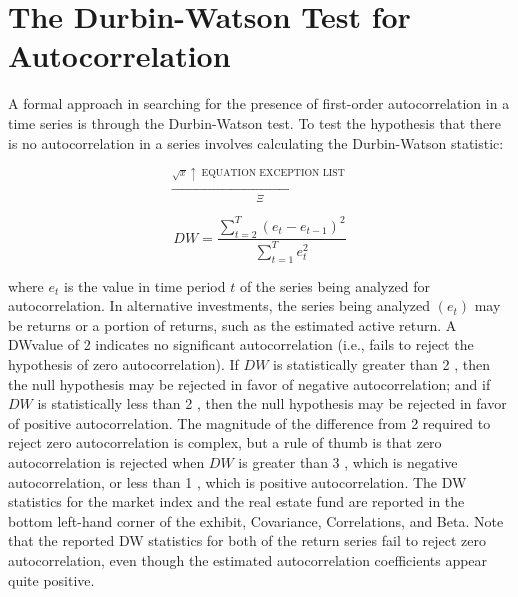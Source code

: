 \documentclass[11pt]{article}
\begin{document}
\section*{The Durbin-Watson Test for Autocorrelation}
A formal approach in searching for the presence of first-order autocorrelation in a time series is through the Durbin-Watson test. To test the hypothesis that there is no autocorrelation in a series involves calculating the Durbin-Watson statistic:

$$
\xrightarrow[\Xi]{\sqrt{x} \uparrow \text { EQUATION EXCEPTION LIST }}
$$

$$
D W=\frac{\sum_{t=2}^{T}\left(e_{t}-e_{t-1}\right)^{2}}{\sum_{t=1}^{T} e_{t}^{2}}
$$

where $e_{t}$ is the value in time period $t$ of the series being analyzed for autocorrelation. In alternative investments, the series being analyzed $\left(e_{t}\right)$ may be returns or a portion of returns, such as the estimated active return. A DWvalue of 2 indicates no significant autocorrelation (i.e., fails to reject the hypothesis of zero autocorrelation). If $D W$ is statistically greater than 2 , then the null hypothesis may be rejected in favor of negative autocorrelation; and if $D W$ is statistically less than 2 , then the null hypothesis may be rejected in favor of positive autocorrelation. The magnitude of the difference from 2 required to reject zero autocorrelation is complex, but a rule of thumb is that zero autocorrelation is rejected when $D W$ is greater than 3 , which is negative autocorrelation, or less than 1 , which is positive autocorrelation. The DW statistics for the market index and the real estate fund are reported in the bottom left-hand corner of the exhibit, Covariance, Correlations, and Beta. Note that the reported DW statistics for both of the return series fail to reject zero autocorrelation, even though the estimated autocorrelation coefficients appear quite positive.
\end{document}
